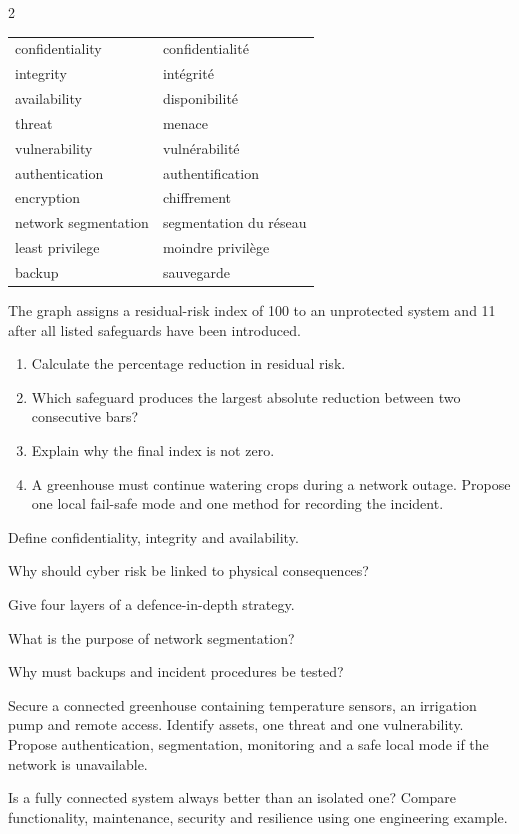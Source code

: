 \begin{multicols}{2}
\begin{vocabulary}
\begin{tabularx}{\linewidth}{@{}lX@{}}
confidentiality & confidentialité\\
integrity & intégrité\\
availability & disponibilité\\
threat & menace\\
vulnerability & vulnérabilité\\
authentication & authentification\\
encryption & chiffrement\\
network segmentation & segmentation du réseau\\
least privilege & moindre privilège\\
backup & sauvegarde
\end{tabularx}
\end{vocabulary}


\begin{applicationexercise}
The graph assigns a residual-risk index of 100 to an unprotected system and 11 after all listed
safeguards have been introduced.
\begin{enumerate}
\item Calculate the percentage reduction in residual risk.
\item Which safeguard produces the largest absolute reduction between two consecutive bars?
\item Explain why the final index is not zero.
\item A greenhouse must continue watering crops during a network outage. Propose one local fail-safe
mode and one method for recording the incident.
\end{enumerate}
\end{applicationexercise}

\begin{questions}
\item Define confidentiality, integrity and availability.
\item Why should cyber risk be linked to physical consequences?
\item Give four layers of a defence-in-depth strategy.
\item What is the purpose of network segmentation?
\item Why must backups and incident procedures be tested?
\end{questions}

\begin{engineeringchallenge}
Secure a connected greenhouse containing temperature sensors, an irrigation pump and remote access.
Identify assets, one threat and one vulnerability. Propose authentication, segmentation, monitoring
and a safe local mode if the network is unavailable.
\end{engineeringchallenge}

\begin{speaking}
Is a fully connected system always better than an isolated one? Compare functionality, maintenance,
security and resilience using one engineering example.
\end{speaking}
\end{multicols}


